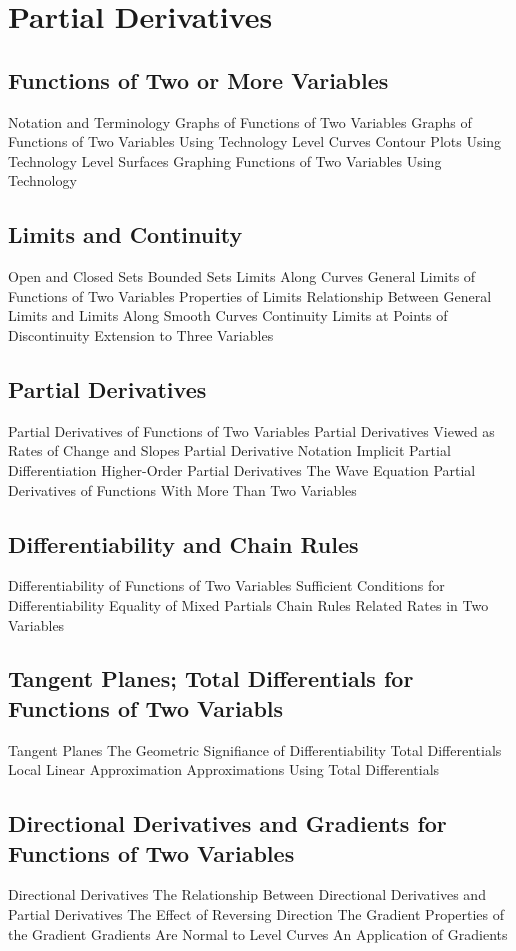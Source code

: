 \documentclass[]{article}
\begin{document}
\section{Partial Derivatives}
\subsection{Functions of Two or More Variables}
Notation and Terminology
Graphs of Functions of Two Variables
Graphs of Functions of Two Variables Using Technology
Level Curves
Contour Plots Using Technology
Level Surfaces
Graphing Functions of Two Variables Using Technology
\subsection{Limits and Continuity}
Open and Closed Sets
Bounded Sets
Limits Along Curves
General Limits of Functions of Two Variables 
Properties of Limits
Relationship Between General Limits and Limits Along Smooth Curves
Continuity
Limits at Points of Discontinuity
Extension to Three Variables
\subsection{Partial Derivatives}
Partial Derivatives of Functions of Two Variables
Partial Derivatives Viewed as Rates of Change and Slopes
Partial Derivative Notation
Implicit Partial Differentiation
Higher-Order Partial Derivatives
The Wave Equation
Partial Derivatives of Functions With More Than Two Variables
\subsection{Differentiability and Chain Rules}
Differentiability of Functions of Two Variables
Sufficient Conditions for Differentiability
Equality of Mixed Partials
Chain Rules
Related Rates in Two Variables
\subsection{Tangent Planes; Total Differentials for Functions of Two Variabls}
Tangent Planes
The Geometric Signifiance of Differentiability
Total Differentials
Local Linear Approximation
Approximations Using Total Differentials
\subsection{Directional Derivatives and Gradients for Functions of Two Variables}
Directional Derivatives
The Relationship Between Directional Derivatives and Partial Derivatives
The Effect of Reversing Direction
The Gradient
Properties of the Gradient
Gradients Are Normal to Level Curves
An Application of Gradients
\end{document}

